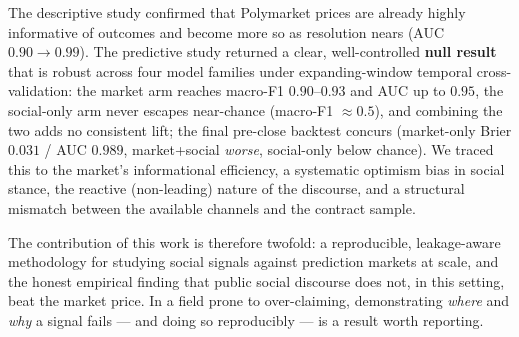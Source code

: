 The descriptive study confirmed that Polymarket prices are already highly informative of
outcomes and become more so as resolution nears (AUC $0.90\!\to\!0.99$). The predictive
study returned a clear, well-controlled \textbf{null result} that is robust across four
model families under expanding-window temporal cross-validation: the market arm reaches
macro-F1 $0.90$--$0.93$ and AUC up to $0.95$, the social-only arm never escapes
near-chance (macro-F1 $\approx0.5$), and combining the two adds no consistent lift; the
final pre-close backtest concurs (market-only Brier $0.031$ / AUC $0.989$, market+social
\emph{worse}, social-only below chance). We traced this to the market's informational
efficiency, a systematic optimism bias in
social stance, the reactive (non-leading) nature of the discourse, and a structural
mismatch between the available channels and the contract sample.

The contribution of this work is therefore twofold: a reproducible, leakage-aware
methodology for studying social signals against prediction markets at scale, and the
honest empirical finding that public social discourse does not, in this setting, beat
the market price. In a field prone to over-claiming, demonstrating \emph{where} and
\emph{why} a signal fails --- and doing so reproducibly --- is a result worth reporting.
